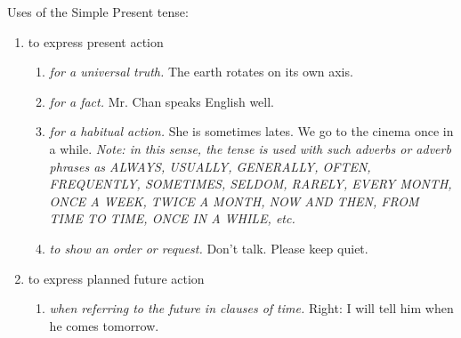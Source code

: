 Uses of the Simple Present tense:
\begin{enumerate}
    \item to express present action
        \begin{enumerate}
            \item {\it for a universal truth.}
                \newline
                \newline
                The earth rotates on its own axis.
            \item {\it for a fact.}
                \newline
                \newline
                Mr. Chan speaks English well.
            \item {\it for a habitual action.}
                \newline
                \newline
                She is sometimes lates.
                \newline
                \newline
                We go to the cinema once in a while.
                \newline
                \newline
                {\it Note: in this sense, the tense is used with such adverbs
                or adverb phrases as ALWAYS, USUALLY, GENERALLY, OFTEN,
                FREQUENTLY, SOMETIMES, SELDOM, RARELY, EVERY MONTH, ONCE A WEEK,
                TWICE A MONTH, NOW AND THEN, FROM TIME TO TIME, ONCE IN A WHILE,
                etc.}
            \item {\it to show an order or request.}
                \newline
                \newline
                Don't talk.
                \newline
                \newline
                Please keep quiet.
        \end{enumerate}
    \item to express planned future action
        \begin{enumerate}
            \item {\it when referring to the future in clauses of time.}
                \newline
                \newline
                Right: I will tell him when he comes tomorrow.
                \newline

\end{enumerate}
\end{enumerate}
